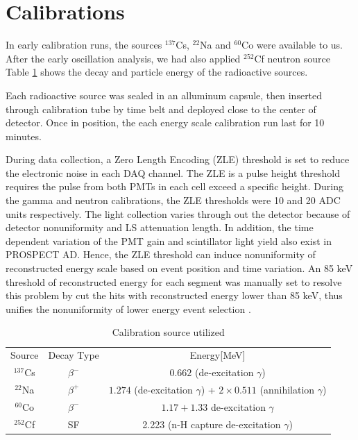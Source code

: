 \section{Calibrations}
In early calibration runs, the sources $^{137}$Cs, $^{22}$Na and $^{60}$Co were available to us. 
After the early oscillation analysis, we had also applied $^{252}$Cf neutron source 
Table \ref{tab:src_table} shows the decay and particle energy of the radioactive sources.

Each radioactive source was sealed in an alluminum capsule, then inserted through calibration tube by time belt and deployed close to the center of detector.
Once in position, the each energy scale calibration run last for 10 minutes.

During data collection, a Zero Length Encoding (ZLE) threshold is set to reduce the electronic noise in each DAQ channel.
The ZLE is a pulse height threshold requires the pulse from both PMTs in each cell exceed a specific height.
During the gamma and neutron calibrations, the ZLE thresholds were 10 and 20 ADC units respectively.
The light collection varies through out the detector because of detector nonuniformity and LS attenuation length.
In addition, the time dependent variation of the PMT gain and scintillator light yield also exist in PROSPECT AD.
Hence, the ZLE threshold can induce nonuniformity of reconstructed energy scale based on event position and time variation.
An 85 keV threshold of reconstructed energy for each segment was manually set to resolve this problem by cut the hits with reconstructed energy lower than 85 keV, thus unifies the nonuniformity of lower energy event selection \cite{doc85kev}. 

\begin{table}
    \centering
    \begin{tabular}{c|c|c}
        Source & Decay Type & Energy[MeV]\\
        $^{137}$Cs  & $\beta^-$   & $0.662$ (de-excitation $\gamma$)\\
        $^{22}$Na   & $\beta^+$   & $1.274$ (de-excitation $ \gamma$) + $2\times0.511$ (annihilation $\gamma$) \\
        $^{60}$Co   & $\beta^-$   & $1.17 + 1.33$ de-excitation $\gamma$ \\
        $^{252}$Cf  & SF   & 2.223 (n-H capture de-excitation $\gamma$)
    \end{tabular}
    \caption{Calibration source utilized}
    \label{tab:src_table}
\end{table}

